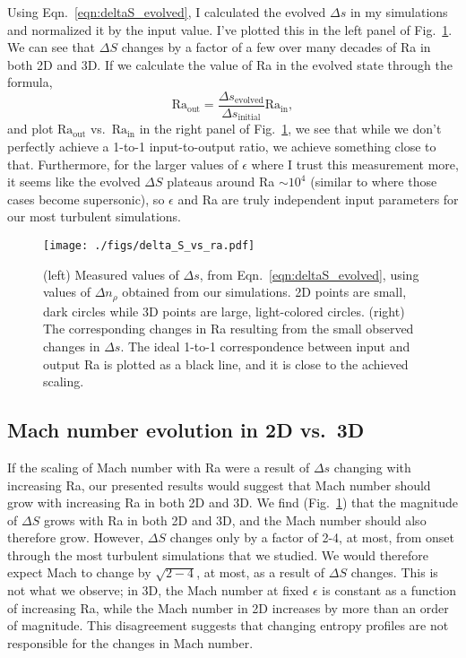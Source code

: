 \documentclass[aps, pre, onecolumn, nofootinbib, notitlepage, groupedaddress, amsfonts, amssymb, amsmath, longbibliography, superscriptaddress]{revtex4-1}
\begin{document}
Using Eqn.~\ref{eqn:deltaS_evolved}, I calculated the evolved $\Delta s$ in my simulations and normalized it by the input value.
I've plotted this in the left panel of Fig.~\ref{fig:delta_S_vs_ra}.
We can see that $\Delta S$ changes by a factor of a few over many decades of Ra in both 2D and 3D.
If we calculate the value of Ra in the evolved state through the formula,
$$
\text{Ra}_{\text{out}} = \frac{\Delta s_{\text{evolved}}}{\Delta s_{\text{initial}}} \text{Ra}_{\text{in}},
$$
and plot $\text{Ra}_{\text{out}}$ vs.~$\text{Ra}_{\text{in}}$ in the right panel of Fig.~\ref{fig:delta_S_vs_ra}, we see that while we don't perfectly achieve a 1-to-1 input-to-output ratio, we achieve something close to that.
Furthermore, for the larger values of $\epsilon$ where I trust this measurement more, it seems like the evolved $\Delta S$ plateaus around Ra $\sim 10^4$ (similar to where those cases become supersonic), so $\epsilon$ and Ra are truly independent input parameters for our most turbulent simulations.


\begin{figure}[t!]
\texttt{[image: ./figs/delta\_S\_vs\_ra.pdf]}
\caption{ (left) Measured values of $\Delta s$, from Eqn.~\ref{eqn:deltaS_evolved}, using values of $\Delta n_\rho$ obtained from our simulations.
		  2D points are small, dark circles while 3D points are large, light-colored circles.
		  (right) The corresponding changes in Ra resulting from the small observed changes in $\Delta s$.
		  The ideal 1-to-1 correspondence between input and output Ra is plotted as a black line, and it is close to the achieved scaling.
	\label{fig:delta_S_vs_ra} }
\end{figure}


\subsection{Mach number evolution in 2D vs.~3D}
If the scaling of Mach number with Ra were a result of $\Delta s$ changing with increasing Ra, our presented results would suggest that Mach number should grow with increasing Ra in both 2D and 3D.
We find (Fig.~\ref{fig:delta_S_vs_ra}) that the magnitude of $\Delta S$ grows with Ra in both 2D and 3D, and the Mach number should also therefore grow.
However, $\Delta S$ changes only by a factor of 2-4, at most, from onset through the most turbulent simulations that we studied.
We would therefore expect Mach to change by $\sqrt{2-4}$, at most, as a result of $\Delta S$ changes.
This is not what we observe; in 3D, the Mach number at fixed $\epsilon$ is constant as a function of increasing Ra, while the Mach number in 2D increases by more than an order of magnitude.
This disagreement suggests that changing entropy profiles are not responsible for the changes in Mach number.
\end{document}
